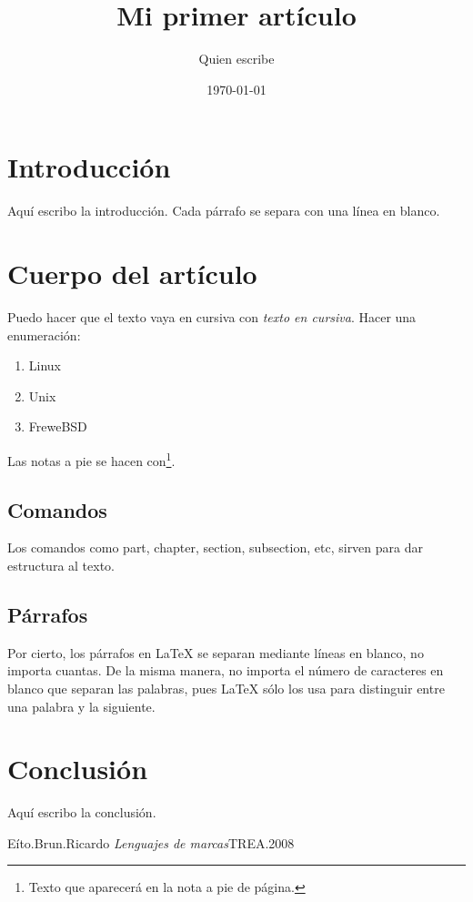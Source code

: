 \documentclass[12pt]{report} %
\title{Mi primer art\'iculo} %
\author{Quien escribe} %
\date{\today} %
\begin{document}
 
\maketitle %
 
\tableofcontents %
 
\section{Introducci\'on} %
 
Aqu\'i escribo la introducci\'on. Cada p\'arrafo se separa con una l\'inea en blanco.
 
\section{Cuerpo del art\'iculo} %
 
Puedo hacer que el texto vaya en cursiva con \emph{texto en cursiva}. Hacer una enumeraci\'on:
 
\begin{enumerate}
 
\item Linux
 
\item Unix
 
\item FreweBSD
 
\end{enumerate}
 
Las notas a  pie se hacen con\footnote{Texto que aparecer\'a en la nota a pie de p\'agina.}.
 
\subsection{Comandos}
Los comandos como part, chapter, section, subsection, etc, sirven 
para dar estructura al texto. 

\subsection{P\'arrafos}
Por cierto, los p\'arrafos en \LaTeX{} se separan mediante l\'ineas 
en blanco, no importa cuantas. De la misma manera, no importa el 
n\'umero de caracteres en blanco que separan las palabras, pues 
\LaTeX{} s\'olo los usa para distinguir entre una palabra y la
siguiente.

 
\section{Conclusi\'on}
Aqu\'i escribo la conclusi\'on.
\begin{thebibliography}{10}
E\'ito.Brun.Ricardo
\textit{Lenguajes de marcas}TREA.2008
\end{thebibliography}
 
\end{document}
